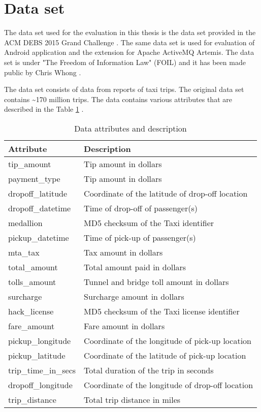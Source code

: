 \section{Data set} \label{dataset}

The data set used for the evaluation in this thesis is the data set provided in the ACM DEBS 2015 Grand Challenge \parencite{debs2015}. The same data set is used for evaluation of Android application and the extension for Apache ActiveMQ Artemis. The data set is under "The Freedom of Information Law" (FOIL) and it has been made public by Chris Whong \parencite{debs2015_dataset}.

The data set consists of data from reports of taxi trips. The original data set contains \textasciitilde170 million trips. The data contains various attributes that are described in the Table \ref{table:data} \parencite{debs2015_desc}.

\begin{table}[h!]
  \centering
  \caption{Data attributes and description}
  \label{table:data}
  \begin{tabular}{ll}
    \toprule
    Attribute & Description\\
    \midrule
    tip\_amount & Tip amount in dollars\\
    payment\_type & Tip amount in dollars\\
	dropoff\_latitude & Coordinate of the latitude of drop-off location\\
	dropoff\_datetime & Time of drop-off of passenger(s)\\
	medallion & MD5 checksum of the Taxi identifier\\
	pickup\_datetime & Time of pick-up of passenger(s)\\
	mta\_tax & Tax amount in dollars\\
	total\_amount & Total amount paid in dollars\\
	tolls\_amount & Tunnel and bridge toll amount in dollars\\
	surcharge & Surcharge amount in dollars\\
	hack\_license & MD5 checksum of the Taxi license identifier\\
	fare\_amount & Fare amount in dollars\\
	pickup\_longitude & Coordinate of the longitude of pick-up location\\
	pickup\_latitude & Coordinate of the latitude of pick-up location\\
	trip\_time\_in\_secs & Total duration of the trip in seconds\\
	dropoff\_longitude & Coordinate of the longitude of drop-off location\\
	trip\_distance & Total trip distance in miles\\
    \bottomrule
  \end{tabular}
\end{table} 

